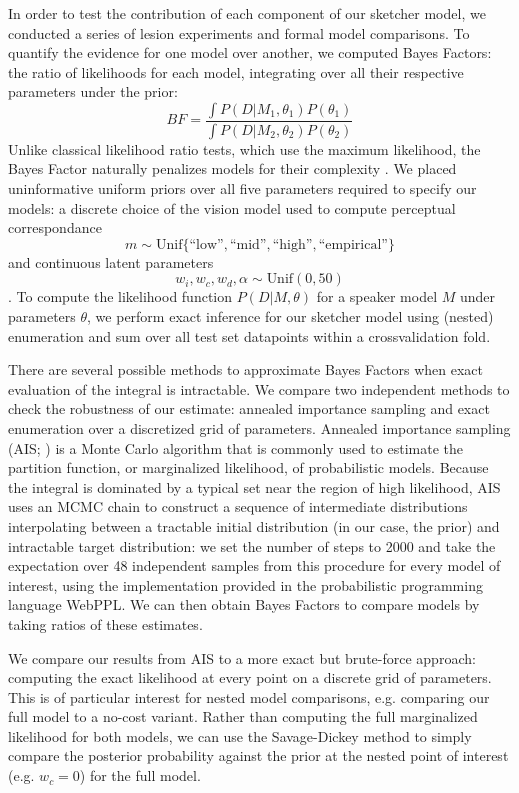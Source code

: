 \documentclass[9pt,twocolumn,twoside]{pnas-new}
\begin{document}
{In order to test the contribution of each component of our sketcher model, we conducted a series of lesion experiments and formal model comparisons.
To quantify the evidence for one model over another, we computed Bayes Factors:
the ratio of likelihoods for each model, integrating over all their respective parameters under the prior:
$$BF = \frac{\int P(D | M_1, \theta_1)P(\theta_1)}{\int P(D | M_2, \theta_2)P(\theta_2)}$$
Unlike classical likelihood ratio tests, which use the maximum likelihood, the Bayes Factor naturally penalizes models for their complexity \cite{wagenmakers2018bayesian,jefferys1992ockham}.
We placed uninformative uniform priors over all five parameters required to specify our models: a discrete choice of the vision model used to compute perceptual correspondance
$$m \sim \textrm{Unif}\{\textrm{``low''}, \textrm{``mid''}, \textrm{``high''}, \textrm{``empirical''}\}$$
and continuous latent parameters
$$w_i, w_c, w_d, \alpha \sim \textrm{Unif}(0, 50)$$. 
To compute the likelihood function $P(D | M, \theta)$ for a speaker model $M$ under parameters $\theta$, we perform exact inference for our sketcher model using (nested) enumeration and sum over all test set datapoints within a crossvalidation fold. 

There are several possible methods to approximate Bayes Factors when exact evaluation of the integral is intractable. We compare two independent methods to check the robustness of our estimate: annealed importance sampling and exact enumeration over a discretized grid of parameters. Annealed importance sampling (AIS; \cite{neal2001annealed}) is a Monte Carlo algorithm that is commonly used to estimate the partition function, or marginalized likelihood, of probabilistic models. Because the integral is dominated by a typical set near the region of high likelihood, AIS uses an MCMC chain to construct a sequence of intermediate distributions interpolating between a tractable initial distribution (in our case, the prior) and intractable target distribution: we set the number of steps to 2000 and take the expectation over 48 independent samples from this procedure for every model of interest, using the implementation provided in the probabilistic programming language WebPPL. We can then obtain Bayes Factors to compare models by taking ratios of these estimates.

We compare our results from AIS to a more exact but brute-force approach: computing the exact likelihood at every point on a discrete grid of parameters.
This is of particular interest for nested model comparisons, e.g. comparing our full model to a no-cost variant.
Rather than computing the full marginalized likelihood for both models, we can use the Savage-Dickey method \cite{wagenmakers2010bayesian} to simply compare the posterior probability against the prior at the nested point of interest (e.g. $w_c = 0$) for the full model.

}
\end{document}
